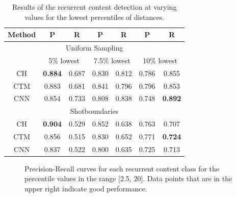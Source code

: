 \documentclass{article}
\begin{document}
\begin{table}[H]
	\begin{center}
		\begin{tabular}{ c c c c c c c} 
			\hline
			\textbf{Method} & \textbf{P} & \textbf{R} & \textbf{P} & \textbf{R} & \textbf{P} & \textbf{R} \\
			\hline
			\multicolumn{7}{c}{Uniform Sampling} \\
			 & \multicolumn{2}{c}{5\% lowest} & \multicolumn{2}{c}{7.5\% lowest} & \multicolumn{2}{c}{10\% lowest} \\
			\hline	
			CH 				& \textbf{0.884} 	& 0.687		& 0.830 	& 0.812 	& 0.786	 	& 0.855 \\
			CTM 			& 0.883 	& 0.681 		& 0.841 	& 0.796 & 0.796 	& 0.853 \\
			CNN 			& 0.854		& 0.733			& 0.808		& 0.838 & 0.748		& \textbf{0.892} \\
			\hline
			\multicolumn{7}{c}{Shotboundaries} \\
			\hline
			CH	 			& \textbf{0.904}		& 0.529 		& 0.852  	& 0.638 & 0.763	 	& 0.707 \\
			CTM 			& 0.856 	& 0.515 		& 0.830 	& 0.652 & 0.771		& \textbf{0.724} \\
			CNN 			& 0.837		& 0.522			& 0.800		& 0.635 & 0.725		& 0.713  \\
			\hline
		\end{tabular}
	\end{center}
	\caption{Results of the recurrent content detection at varying values for the lowest percentiles of distances.}
	\label{table:resultsrecurring}
\end{table}

\begin{figure}[h]
	\centering
	\caption{Precision-Recall curves for each recurrent content class for the percentile values in the range [2.5, 20]. Data points that are in the upper right indicate good performance.}
	\label{fig:precision-recall}
\end{figure}
\end{document}
